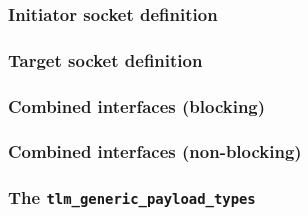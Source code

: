 {\begin{frame}
	\frametitle{Initiator socket definition}
	
\end{frame}

\begin{frame}
	\frametitle{Target socket definition}
	
\end{frame}

\begin{frame}
	\frametitle{Combined interfaces (blocking)}
	
\end{frame}

\begin{frame}
	\frametitle{Combined interfaces (non-blocking)}
	
\end{frame}

\begin{frame}
	\frametitle{The \texttt{tlm\_generic\_payload\_types}}
	
\end{frame}
}
